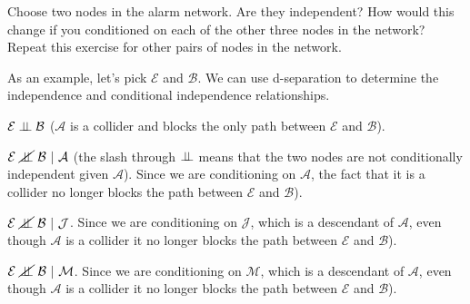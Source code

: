 \documentclass{tufte-handout}
\begin{document}
\begin{exercise}
Choose two nodes in the alarm network.  Are they independent?  How would this change if you conditioned on each of the other three nodes in the network?  Repeat this exercise for other pairs of nodes in the network.
\begin{boxedsolution}
As an example, let's pick $\mathcal{E}$ and $\mathcal{B}$.  We can use d-separation to determine the independence and conditional independence relationships.
\bi
\item $\mathcal{E} \perp\!\!\!\perp \mathcal{B}$ ($\mathcal{A}$ is a collider and blocks the only path between $\mathcal{E}$ and $\mathcal{B}$).
\item $\mathcal{E} ~\cancel{\perp\!\!\!\perp}~ \mathcal{B}~|~\mathcal{A}$ (the slash through $\perp\!\!\!\perp$ means that the two nodes are not conditionally independent given $\mathcal{A}$).  Since we are conditioning on $\mathcal{A}$, the fact that it is a collider no longer blocks the path between $\mathcal{E}$ and $\mathcal{B}$).
\item $\mathcal{E} ~\cancel{\perp\!\!\!\perp}~ \mathcal{B}~|~\mathcal{J}$.  Since we are conditioning on $\mathcal{J}$, which is a descendant of $\mathcal{A}$, even though $\mathcal{A}$ is a collider it no longer blocks the path between $\mathcal{E}$ and $\mathcal{B}$).
\item $\mathcal{E} ~\cancel{\perp\!\!\!\perp}~ \mathcal{B}~|~\mathcal{M}$.  Since we are conditioning on $\mathcal{M}$, which is a descendant of $\mathcal{A}$, even though $\mathcal{A}$ is a collider it no longer blocks the path between $\mathcal{E}$ and $\mathcal{B}$).
\ei
\end{boxedsolution}
\end{exercise}
\end{document}
